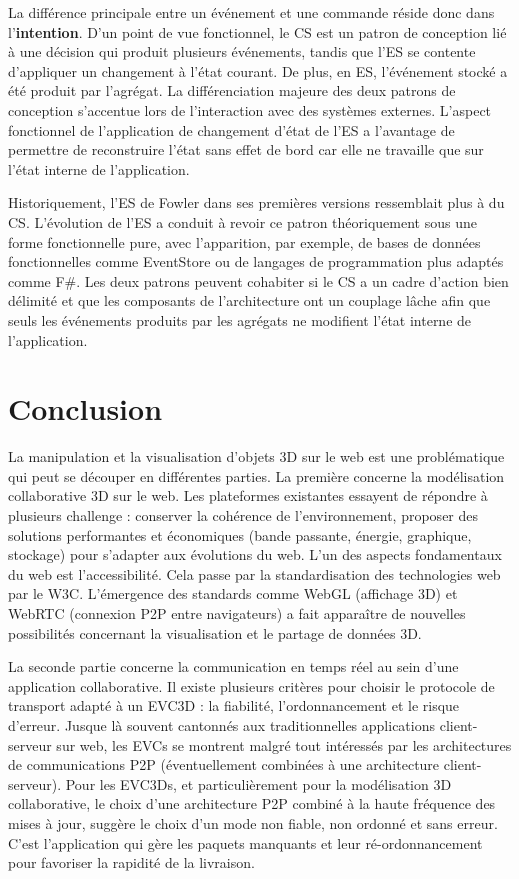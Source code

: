 La différence principale entre un événement et une commande réside donc dans 
l'\textbf{inten\-tion}. D'un point de vue fonctionnel, le \gls{CS} est un patron de 
conception lié à une décision qui produit plusieurs événements, tandis que 
l'\gls{ES} se contente d'appliquer un changement à l'état courant. De plus, en 
\gls{ES}, l'événement stocké a été produit par l'agrégat. 
La différenciation majeure des deux patrons de conception s'accentue lors de 
l'interaction avec des systèmes externes. L'aspect fonctionnel de l'application de 
changement d'état de l'\gls{ES} a l'avantage de permettre de reconstruire l'état sans 
effet de bord car elle ne travaille que sur l'état interne de l'application. 

Historiquement, l'\gls{ES} de Fowler dans ses premières versions ressemblait plus 
à du \gls{CS}. L'évolution de l'\gls{ES} a conduit à revoir ce patron théoriquement 
sous une forme fonctionnelle pure, avec l'apparition, par exemple, de bases de données fonctionnelles comme EventStore ou de langages de programmation plus adaptés comme F\#. Les deux 
patrons peuvent cohabiter si le \gls{CS} a un cadre d'action bien délimité 
et que les composants de l'architecture ont un couplage lâche afin que seuls les 
événements produits par les agrégats ne modifient l'état interne de l'application. 

\section{Conclusion}

La manipulation et la visualisation d'objets \gls{3D} sur le web est une 
problématique qui peut se découper en différentes parties.
La première concerne la modélisation collaborative \gls{3D} sur le web. Les 
plateformes existantes essayent de répondre à plusieurs challenge : conserver la cohérence 
de l'environnement, proposer des solutions performantes et économiques (bande 
passante, énergie, graphique, stockage)  pour s'adapter aux évolutions du web.
L'un des aspects fondamentaux du web est l'accessibilité. Cela passe par la 
standardisation des technologies web par le \gls{W3C}.  L'émergence des 
standards comme WebGL (affichage \gls{3D}) et WebRTC (connexion P2P entre 
navigateurs) a fait apparaître de nouvelles possibilités concernant la visualisation 
et le partage de données \gls{3D}. 


La seconde partie concerne la communication en temps réel au sein d'une 
application collaborative. Il existe plusieurs critères pour choisir le protocole de 
transport adapté à un \gls{EVC3D} : la fiabilité, l'ordonnancement et le risque 
d'erreur. 
Jusque là souvent cantonnés aux traditionnelles 
applications client-serveur sur web, les \glspl{EVC} se montrent malgré tout 
intéressés par les architectures de communications P2P (éventuellement 
combinées à une architecture client-serveur). Pour les \glspl{EVC3D}, et 
particulièrement pour la modélisation 3D collaborative, le choix d'une 
architecture \gls{P2P} combiné à la haute fréquence des mises à jour, suggère le 
choix d'un mode non fiable, non ordonné et sans erreur. C'est l'application qui gère 
les paquets manquants et leur ré-ordonnancement pour favoriser la rapidité 
de la livraison.

